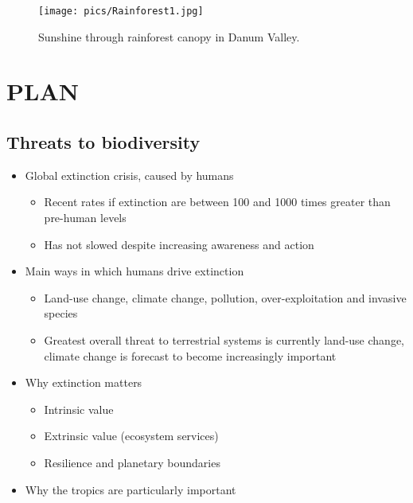 \documentclass[12pt,a4paper,]{report}
\providecommand{\tightlist}{%
  \setlength{\itemsep}{0pt}\setlength{\parskip}{0pt}}
\theoremstyle{definition}
\theoremstyle{definition}
\theoremstyle{definition}
\theoremstyle{remark}
\begin{document}
\begin{figure}[!htb]
\centering
\texttt{[image: pics/Rainforest1.jpg]}
\caption*{Sunshine through rainforest canopy in Danum Valley.}
\end{figure}

\pagebreak

\chapter{PLAN}\label{plan}

\section{Threats to biodiversity}\label{threats-to-biodiversity}

\begin{itemize}
\tightlist
\item
  Global extinction crisis, caused by humans \citep{barnosky_has_2011}

  \begin{itemize}
  \tightlist
  \item
    Recent rates if extinction are between 100 and 1000 times greater
    than pre-human levels \citep{barnosky_has_2011, pimm_future_1995}
  \item
    Has not slowed despite increasing awareness and action
    \citep{butchart_globall_2010}
  \end{itemize}
\item
  Main ways in which humans drive extinction

  \begin{itemize}
  \tightlist
  \item
    Land-use change, climate change, pollution, over-exploitation and
    invasive species \citep{hirsch_global_2010}
  \item
    Greatest overall threat to terrestrial systems is currently land-use
    change, climate change is forecast to become increasingly important
    \citep{sala_global_2000}
  \end{itemize}
\item
  Why extinction matters

  \begin{itemize}
  \tightlist
  \item
    Intrinsic value \citep{mace_whose_2014}
  \item
    Extrinsic value (ecosystem services)
    \citep{balmford_economic_2002, constanza_value_1997}
  \item
    Resilience \citep{oliver_declining_2015} and planetary boundaries
    \citep{rockstrom_safe_2009}
  \end{itemize}
\item
  Why the tropics are particularly important


\end{itemize}
\end{document}
